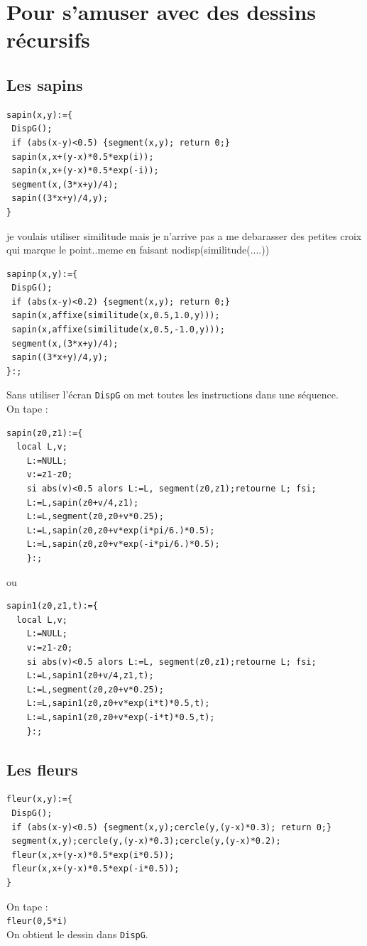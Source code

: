 \documentclass[a4paper,11pt]{book}
\begin{document}
\chapter{Pour s'amuser avec des dessins r\'ecursifs}
\section{Les sapins}
\begin{verbatim}
sapin(x,y):={
 DispG();
 if (abs(x-y)<0.5) {segment(x,y); return 0;}
 sapin(x,x+(y-x)*0.5*exp(i));
 sapin(x,x+(y-x)*0.5*exp(-i));
 segment(x,(3*x+y)/4);
 sapin((3*x+y)/4,y);
}
\end{verbatim}
je voulais utiliser similitude mais je n'arrive pas a me debarasser des petites
 croix qui marque le point..meme en faisant nodisp(similitude(....))
\begin{verbatim}
sapinp(x,y):={
 DispG();
 if (abs(x-y)<0.2) {segment(x,y); return 0;}
 sapin(x,affixe(similitude(x,0.5,1.0,y)));
 sapin(x,affixe(similitude(x,0.5,-1.0,y)));
 segment(x,(3*x+y)/4);
 sapin((3*x+y)/4,y);
}:;
\end{verbatim}
Sans utiliser l'\'ecran {\tt DispG} on met toutes les instructions dans une 
s\'equence.\\
On tape :
\begin{verbatim}
sapin(z0,z1):={
  local L,v;
    L:=NULL;
    v:=z1-z0;
    si abs(v)<0.5 alors L:=L, segment(z0,z1);retourne L; fsi;
    L:=L,sapin(z0+v/4,z1);
    L:=L,segment(z0,z0+v*0.25);
    L:=L,sapin(z0,z0+v*exp(i*pi/6.)*0.5);
    L:=L,sapin(z0,z0+v*exp(-i*pi/6.)*0.5); 
    }:;
\end{verbatim}
ou\\
\begin{verbatim}
sapin1(z0,z1,t):={
  local L,v;
    L:=NULL;
    v:=z1-z0;
    si abs(v)<0.5 alors L:=L, segment(z0,z1);retourne L; fsi;
    L:=L,sapin1(z0+v/4,z1,t);
    L:=L,segment(z0,z0+v*0.25);
    L:=L,sapin1(z0,z0+v*exp(i*t)*0.5,t);
    L:=L,sapin1(z0,z0+v*exp(-i*t)*0.5,t); 
    }:;
\end{verbatim}
\section{Les fleurs}
\begin{verbatim}
fleur(x,y):={
 DispG();
 if (abs(x-y)<0.5) {segment(x,y);cercle(y,(y-x)*0.3); return 0;}
 segment(x,y);cercle(y,(y-x)*0.3);cercle(y,(y-x)*0.2);
 fleur(x,x+(y-x)*0.5*exp(i*0.5));
 fleur(x,x+(y-x)*0.5*exp(-i*0.5));
}
\end{verbatim}
On tape :\\
{\tt fleur(0,5*i)}\\
On obtient le dessin dans {\tt DispG}.
\end{document}
